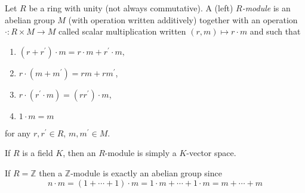 \begin{defn}[Module]
Let $R$ be a ring with unity (not always commutative).
A (left) \emph{$R$-module} is an abelian group $M$
(with operation written additively) together with
an operation $\cdot : R \times M \to M$ called
scalar multiplication written
$(r, m) \mapsto r \cdot m$ and such that
\begin{enumerate}
  \item{
    $(r + r^\prime) \cdot m =
     r \cdot m + r^\prime \cdot m,
    $
  }
  \item{
    $r \cdot (m + m^\prime) = r m + r m^\prime$,
  }
  \item{
    $r \cdot (r^\prime \cdot m) = (r r^\prime) \cdot m$,
  }
  \item{
    $1 \cdot m = m$
  }
\end{enumerate}
for any $r, r^\prime \in R$, $m, m^\prime \in M$.
\end{defn}

\begin{obsv}
If $R$ is a field $K$, then an $R$-module is simply a $K$-vector
space.

If $R = \mathbb{Z}$ then a $\mathbb{Z}$-module is exactly an
abelian group since
$$
  n \cdot m
= (1 + \cdots + 1) \cdot m
= 1 \cdot m + \cdots + 1 \cdot m
= m + \cdots + m
$$
\end{obsv}
